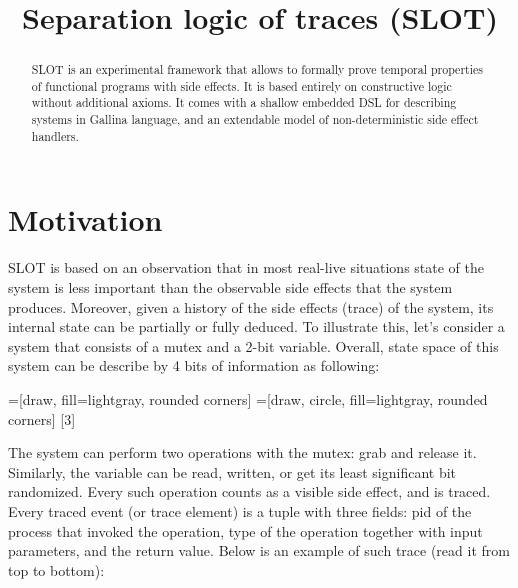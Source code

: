 \documentclass[10pt,letterpaper]{article}
\title{
		\huge Separation logic of traces (SLOT)
}
\theoremstyle{definition}
\begin{document}
\maketitle

\begin{abstract}
  SLOT is an experimental framework that allows to formally prove
  temporal properties of functional programs with side effects. It is
  based entirely on constructive logic without additional axioms. It
  comes with a shallow embedded DSL for describing systems in Gallina
  language, and an extendable model of non-deterministic side effect
  handlers.
\end{abstract}

\section{Motivation}

SLOT is based on an observation that in most real-live situations
state of the system is less important than the observable side effects
that the system produces. Moreover, given a history of the side
effects (trace) of the system, its internal state can be partially or
fully deduced. To illustrate this, let's consider a system that
consists of a mutex and a 2-bit variable. Overall, state space of this
system can be describe by 4 bits of information as following:


=[draw, fill=lightgray, rounded corners]
=[draw, circle, fill=lightgray, rounded corners]
\def \blockdist{2.3}
\def \edgedist{2.5}
\necommand{\state}[3]{

}

\begin{figure}[h]
  \centering
\end{figure}


The system can perform two operations with the mutex: grab and release
it. Similarly, the variable can be read, written, or get its least
significant bit randomized. Every such operation counts as a visible
side effect, and is traced. Every traced event (or trace element) is a
tuple with three fields: pid of the process that invoked the
operation, type of the operation together with input parameters, and
the return value. Below is an example of such trace (read it from top
to bottom):
\end{document}
